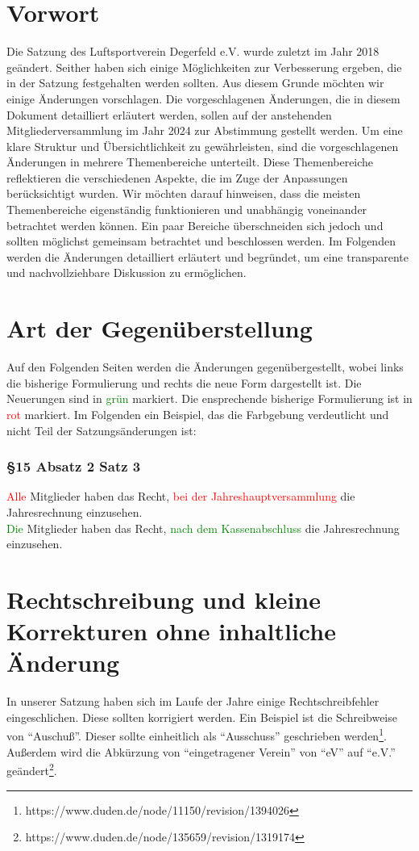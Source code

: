 \documentclass[10pt,a4paper,parskip=half]{scrartcl}
\newcommand{\new}[1]{\textcolor{Green}{#1}}
\newcommand{\old}[1]{\textcolor{Red}{#1}}
\newcommand{\change}[1]{
  \begin{adjustwidth}{20pt}{20pt}
    #1
  \end{adjustwidth}
}
\newcommand{\compare}[3]{\change{\subsubsection*{#1}\begin{multicols}{2}#2\columnbreak\\#3\end{multicols}}}
\begin{document}
\clearpage


\section*{Vorwort}
Die Satzung des Luftsportverein Degerfeld e.V. wurde zuletzt im Jahr 2018 geändert. Seither haben sich einige Möglichkeiten zur Verbesserung ergeben, die in der Satzung festgehalten werden sollten. Aus diesem Grunde möchten wir einige Änderungen vorschlagen. Die vorgeschlagenen Änderungen, die in diesem Dokument detailliert erläutert werden, sollen auf der anstehenden Mitgliederversammlung im Jahr 2024 zur Abstimmung gestellt werden. Um eine klare Struktur und Übersichtlichkeit zu gewährleisten, sind die vorgeschlagenen Änderungen in mehrere Themenbereiche unterteilt. Diese Themenbereiche reflektieren die verschiedenen Aspekte, die im Zuge der Anpassungen berücksichtigt wurden. Wir möchten darauf hinweisen, dass die meisten Themenbereiche eigenständig funktionieren und unabhängig voneinander betrachtet werden können. Ein paar Bereiche überschneiden sich jedoch und sollten möglichst gemeinsam betrachtet und beschlossen werden. Im Folgenden werden die Änderungen detailliert erläutert und begründet, um eine transparente und nachvollziehbare Diskussion zu ermöglichen.


\tableofcontents
\clearpage

\section*{Art der Gegenüberstellung}

   Auf den Folgenden Seiten werden die Änderungen gegenübergestellt, wobei links die bisherige Formulierung und rechts die neue Form dargestellt ist. Die Neuerungen sind in \new{grün} markiert. Die ensprechende bisherige Formulierung ist in \old{rot} markiert. Im Folgenden ein Beispiel, das die Farbgebung verdeutlicht und nicht Teil der Satzungsänderungen ist:

  \compare{§15 Absatz 2 Satz 3}
  {\old{Alle} Mitglieder haben das Recht, \old{bei der Jahreshauptversammlung} die Jahresrechnung einzusehen.}
  {\new{Die} Mitglieder haben das Recht, \new{nach dem Kassenabschluss} die Jahresrechnung einzusehen.}


  \section{Rechtschreibung und kleine Korrekturen ohne inhaltliche Änderung}
  In unserer Satzung haben sich im Laufe der Jahre einige Rechtschreibfehler eingeschlichen. Diese sollten korrigiert werden.
  Ein Beispiel ist die Schreibweise von "`Auschuß"'. Dieser sollte einheitlich als "`Ausschuss"' geschrieben werden\footnote{https://www.duden.de/node/11150/revision/1394026}.
  Außerdem wird die Abkürzung von "`eingetragener Verein"' von "`eV"' auf "`e.V."' geändert\footnote{https://www.duden.de/node/135659/revision/1319174}.
\end{document}
